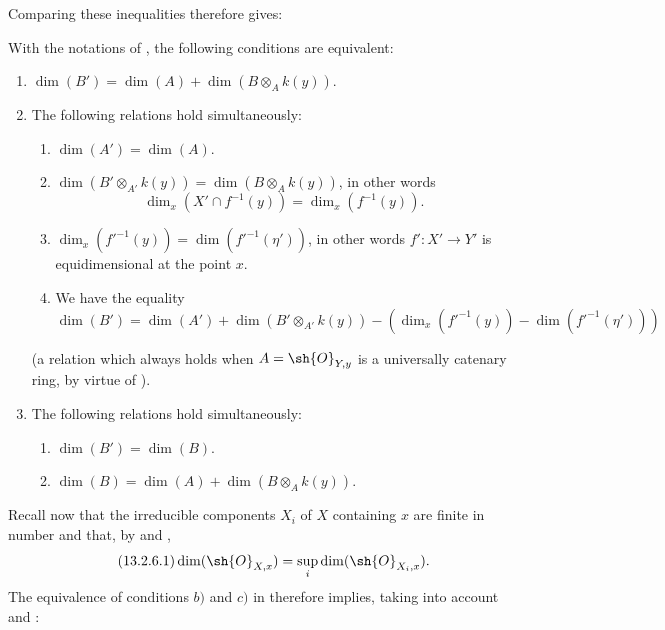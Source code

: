 
Comparing these inequalities therefore gives:

\begin{lemma}[13.2.5]
\label{IV.13.2.5}
With the notations of , the following conditions are equivalent:
\begin{enumerate}[label=\emph{\alph*)}]
  \item $\dim(B')=\dim(A)+\dim(B\otimes_A k(y))$.
  \item The following relations hold simultaneously:
  \begin{enumerate}[label=(\roman*)]
    \item $\dim(A')=\dim(A)$.
    \item $\dim(B'\otimes_{A'}k(y))=\dim(B\otimes_A k(y))$, in other words
    \[
      \dim_x(X'\cap f^{-1}(y))=\dim_x(f^{-1}(y)).
    \]
    \item $\dim_x(f'^{-1}(y))=\dim(f'^{-1}(\eta'))$, in other words $f':X'\to Y'$ is equidimensional  at the point $x$.
    \item We have the equality
    \[
      \dim(B')=\dim(A')+\dim(B'\otimes_{A'}k(y))-(\dim_x(f'^{-1}(y))-\dim(f'^{-1}(\eta')))
    \]
  \end{enumerate}
  (a relation which always holds when $A=\sh{O}_{Y,y}$ is a universally catenary ring, by virtue of ).
  \item The following relations hold simultaneously:
  \begin{enumerate}[label=(\roman*)]
    \item $\dim(B')=\dim(B)$.
    \item $\dim(B)=\dim(A)+\dim(B\otimes_A k(y))$.
  \end{enumerate}
\end{enumerate}
\end{lemma}

\begin{env}[13.2.6]
\label{IV.13.2.6}
Recall now that the irreducible components $X_i$ of $X$ containing $x$ are finite in number and that, by  and ,
\[
\tag{13.2.6.1}
  \dim(\sh{O}_{X,x})=\sup_i\dim(\sh{O}_{X_i,x}).
\]
The equivalence of conditions $b)$ and $c)$ in  therefore implies, taking into account  and :
\end{env}

